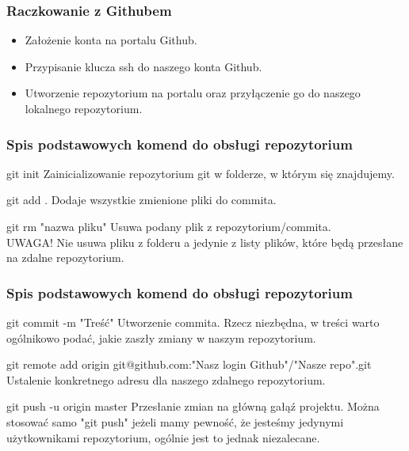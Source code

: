 \documentclass{beamer}
\begin{document}
	\begin{frame}
		\frametitle{Raczkowanie z Githubem}
		\begin{itemize}
			\item Założenie konta na portalu Github.
			\item Przypisanie klucza ssh do naszego konta Github.
			\item Utworzenie repozytorium na portalu oraz przyłączenie go do naszego lokalnego repozytorium.
		\end{itemize}
	\end{frame}


	\begin{frame}
		\frametitle{Spis podstawowych komend do obsługi repozytorium}
			\begin{block}{git init}
				Zainicializowanie repozytorium git w folderze, w którym się znajdujemy.
			\end{block}

			\begin{block}{git add .}
				Dodaje wszystkie zmienione pliki do commita.
			\end{block}
			
			\begin{block}{git rm "nazwa pliku"}
				Usuwa podany plik z repozytorium/commita. \\UWAGA! Nie usuwa pliku z folderu a jedynie z listy plików, które będą przesłane na zdalne repozytorium.
			\end{block}			


	\end{frame}

	
		
	\begin{frame}
		\frametitle{Spis podstawowych komend do obsługi repozytorium}

			\begin{block}{git commit -m "Treść"}
				Utworzenie commita. Rzecz niezbędna, w treści warto ogólnikowo podać, jakie zaszły zmiany w naszym repozytorium.
			\end{block}

			\begin{block}{git remote add origin git@github.com:"Nasz login Github"/"Nasze repo".git}
				Ustalenie konkretnego adresu dla naszego zdalnego repozytorium.
			\end{block}	

			\begin{block}{git push -u origin master}
				Przesłanie zmian na główną gałąź projektu. Można stosować samo "git push" jeżeli mamy pewność, że jesteśmy jedynymi użytkownikami repozytorium, ogólnie jest to jednak niezalecane.
			\end{block}	
			
					
						
	\end{frame}
\end{document}
